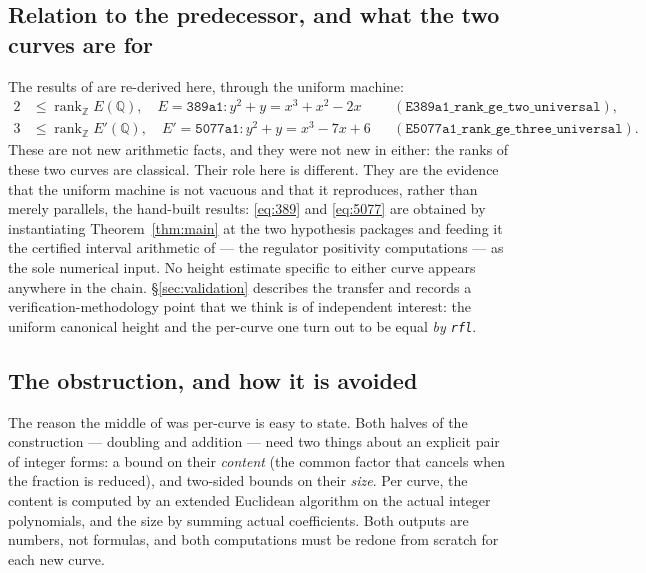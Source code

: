 \documentclass[11pt,reqno]{amsart}
\theoremstyle{plain}
\theoremstyle{definition}
\theoremstyle{remark}
\DeclareRobustCommand{\lt}[1]{\texttt{#1}}
\DeclareMathOperator{\rank}{rank}
\begin{document}
\subsection{Relation to the predecessor, and what the two curves are for}

The results of \cite{MW} are re-derived here, through the uniform
machine:
\begin{align}
  2 &\le \rank_{\mathbb{Z}} E(\mathbb{Q}), \quad
    E = \mathtt{389a1} \colon y^2 + y = x^3+x^2-2x
    &&(\lt{E389a1\_rank\_ge\_two\_universal}), \label{eq:389}\\
  3 &\le \rank_{\mathbb{Z}} E'(\mathbb{Q}), \quad
    E' = \mathtt{5077a1} \colon y^2+y = x^3-7x+6
    &&(\lt{E5077a1\_rank\_ge\_three\_universal}). \label{eq:5077}
\end{align}
These are not new arithmetic facts, and they were not new in \cite{MW}
either: the ranks of these two curves are classical. Their role here is
different. They are the evidence that the uniform machine is not
vacuous and that it reproduces, rather than merely parallels, the
hand-built results: \eqref{eq:389} and \eqref{eq:5077} are obtained by
instantiating Theorem~\ref{thm:main} at the two hypothesis packages and
feeding it the certified interval arithmetic of \cite{MW} --- the
regulator positivity computations --- as the sole numerical input. No
height estimate specific to either curve appears anywhere in the chain.
\S\ref{sec:validation} describes the transfer and records a
verification-methodology point that we think is of independent
interest: the uniform canonical height and the per-curve one turn out to
be equal \emph{by \lt{rfl}}.

\subsection{The obstruction, and how it is avoided}\label{sec:ideas}

The reason the middle of \cite{MW} was per-curve is easy to state. Both
halves of the construction --- doubling and addition --- need two
things about an explicit pair of integer forms: a bound on their
\emph{content} (the common factor that cancels when the fraction is
reduced), and two-sided bounds on their \emph{size}. Per curve, the
content is computed by an extended Euclidean algorithm on the actual
integer polynomials, and the size by summing actual coefficients. Both
outputs are numbers, not formulas, and both computations must be redone
from scratch for each new curve.
\end{document}
